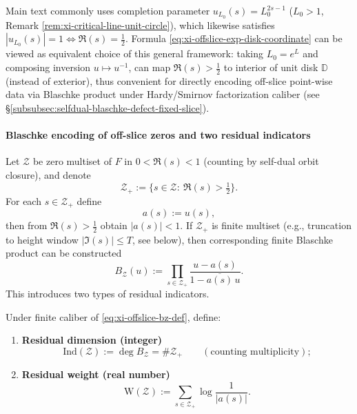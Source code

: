 \begin{remark}\label{rem:xi-offslice-exp-vs-dirichlet}
Main text commonly uses completion parameter \(u_{L_0}(s)=L_0^{2s-1}\) (\(L_0>1\), Remark \ref{rem:xi-critical-line-unit-circle}), which likewise satisfies \(|u_{L_0}(s)|=1\iff \Re(s)=\tfrac12\).
Formula \eqref{eq:xi-offslice-exp-disk-coordinate} can be viewed as equivalent choice of this general framework: taking \(L_0=e^{L}\) and composing inversion \(u\mapsto u^{-1}\), can map \(\Re(s)>\tfrac12\) to interior of unit disk \(\mathbb{D}\) (instead of exterior), thus convenient for directly encoding off-slice point-wise data via Blaschke product under Hardy/Smirnov factorization caliber (see \S\ref{subsubsec:selfdual-blaschke-defect-fixed-slice}).
\end{remark}

\paragraph{Blaschke encoding of off-slice zeros and two residual indicators}
Let \(\mathcal{Z}\) be zero multiset of \(F\) in \(0<\Re(s)<1\) (counting by self-dual orbit closure), and denote
\[
\mathcal Z_{+}:=\{s\in\mathcal Z:\ \Re(s)>\tfrac12\}.
\]
For each \(s\in\mathcal Z_{+}\) define
\begin{equation}\label{eq:xi-offslice-a-of-s}
a(s):=u(s),
\end{equation}
then from \(\Re(s)>\tfrac12\) obtain \(|a(s)|<1\).
If \(\mathcal Z_{+}\) is finite multiset (e.g., truncation to height window \(|\Im(s)|\le T\), see below), then corresponding finite Blaschke product can be constructed
\begin{equation}\label{eq:xi-offslice-bz-def}
B_{\mathcal Z}(u):=\prod_{s\in\mathcal Z_{+}}\frac{u-a(s)}{1-\overline{a(s)}\,u}.
\end{equation}
This introduces two types of residual indicators.

\begin{definition}\label{def:xi-offslice-ind-weight}
Under finite caliber of \eqref{eq:xi-offslice-bz-def}, define:
\begin{enumerate}
  \item \textbf{Residual dimension (integer)}
  \[
  \mathrm{Ind}(\mathcal Z):=\deg B_{\mathcal Z}= \#\mathcal Z_{+}\qquad(\text{counting multiplicity});
  \]
  \item \textbf{Residual weight (real number)}
  \[
  \mathrm{W}(\mathcal Z):=\sum_{s\in\mathcal Z_{+}}\log\frac{1}{|a(s)|}.
  \]
\end{enumerate}
\end{definition}

